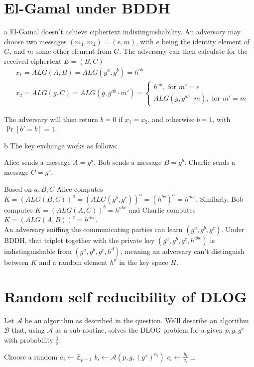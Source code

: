 \documentclass{article}
\begin{document}
\section{El-Gamal under BDDH}
\begin{paragraph}
	a El-Gamal doesn't achieve ciphertext indistinguishability. An adversary may choose two messages $(m_1, m_2) = (e, m)$, with \(e\) being the identity element of \(G\), and \(m\) some other element from \(G\). The adversary can then calculate for the received ciphertext $E = (B,C)$ -
	\begin{align*}
		&x_1 = ALG(A, B) = ALG(g^a, g^b) = h^{ab} \\
		&x_2 = ALG(g, C) = ALG(g, g^{ab} \cdot m') = 
		\begin{cases}
			h^{ab}, \mbox{ for } m' = e \\
			ALG(g, g^{ab} \cdot m), \mbox{ for } m' = m
		\end{cases}
	\end{align*}

	The adversary will then return $b = 0$ if $x_1 = x_2$, and otherwise $b = 1$, with $\Pr[b' = b] = 1$.
\end{paragraph}

\begin{paragraph}
	b The key exchange works as follows:
	
	Alice sends a message $A = g^a$. Bob sends a message $B = g^b$. Charlie sends a message $C = g^c$.
	
	Based on $a, B, C$ Alice computes $K = (ALG(B, C))^a = (ALG(g^b, g^c))^a = (h^{bc})^a = h^{abc}$. Similarly, Bob computes $K = (ALG(A,C))^b = h^{abc}$ and Charlie computes $K = (ALG(A,B))^c = h^{abc}$.\\
	
	An adversary sniffing the communicating parties can learn $(g^a, g^b, g^c)$. Under BDDH, that triplet together with the private key $(g^a, g^b, g^c, h^{abc})$ is indistinguishable from $(g^a, g^b, g^c, h^d)$, meaning an adversary can't distinguish between $K$ and a random element $h^d$ in the key space $H$.
\end{paragraph}
\newpage

\section{Random self reducibility of DLOG}
\quad Let \(\mathcal{A}\) be an algorithm as described in the question. We'll describe an algorithm \(\mathcal{B}\) that, using \(\mathcal{A}\) as a sub-routine, solves the DLOG problem for a given \(p, g, g^x\) with probability \(\frac{1}{2}\).
\begin{algorithm}
	\begin{algorithmic}[1]
			\State Choose a random \(a_i \gets \mathbb{Z}_{p - 1}\)
			\State \(b_i \gets \mathcal{A}(p, g, (g^x)^{a_i})\)
			    \Return \(c_i \gets \frac{b_i}{a_i}\)
			\EndIf
		\EndFor
		\State \Return \(\bot\)
	\end{algorithmic}
\end{algorithm}
\end{document}
